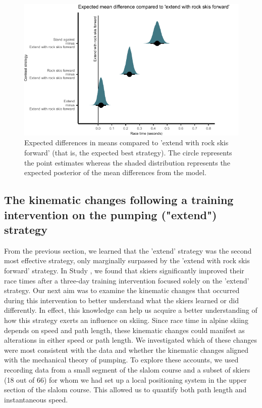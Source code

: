 \begin{figure}[H]
\centering
\includegraphics{figure/figure_results_Q1_strategies_2.pdf}
\caption{Expected differences in means compared to 'extend with rock skis forward' (that is, the expected best strategy). The circle represents the point estimates whereas the shaded distribution represents the expected posterior of the mean differences from the model.}
\label{fig:q1_strategieseffect}
\end{figure}



\subsection{The kinematic changes following a training intervention on the pumping ("extend") strategy}
From the previous section, we learned that the 'extend' strategy was the second most effective strategy, only marginally surpassed by the 'extend with rock skis forward' strategy. In Study , we found that skiers significantly improved their race times after a three-day training intervention focused solely on the 'extend' strategy. Our next aim was to examine the kinematic changes that occurred during this intervention to better understand what the skiers learned or did differently. In effect, this knowledge can help us acquire a better understanding of how this strategy exerts an influence on skiing. Since race time in alpine skiing depends on speed and path length, these kinematic changes could manifest as alterations in either speed or path length. We investigated which of these changes were most consistent with the data and whether the kinematic changes aligned with the mechanical theory of pumping. To explore these accounts, we used recording data from a small segment of the slalom course and a subset of skiers (18 out of 66) for whom we had set up a local positioning system in the upper section of the slalom course. This allowed us to quantify both path length and instantaneous speed.

